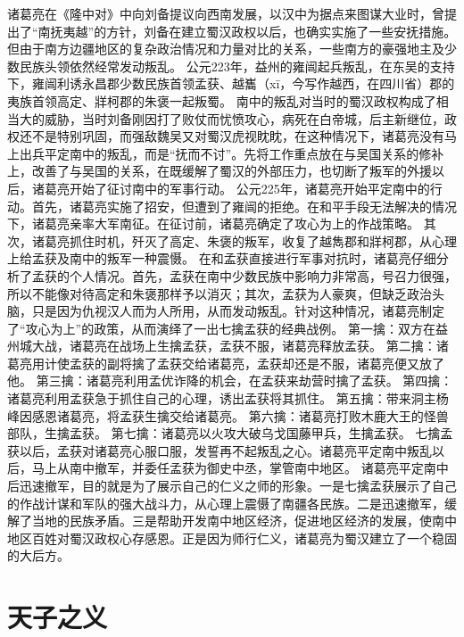 \documentclass[a4paper,12pt,UTF8,twoside]{ctexbook}
\begin{document}
诸葛亮在《隆中对》中向刘备提议向西南发展，以汉中为据点来图谋大业时，曾提出了“南抚夷越”的方针，刘备在建立蜀汉政权以后，也确实实施了一些安抚措施。但由于南方边疆地区的复杂政治情况和力量对比的关系，一些南方的豪强地主及少数民族头领依然经常发动叛乱。
公元223年，益州的雍闿起兵叛乱，在东吴的支持下，雍闿利诱永昌郡少数民族首领孟获、越巂（xī，今写作越西，在四川省）郡的夷族首领高定、牂柯郡的朱褒一起叛蜀。
南中的叛乱对当时的蜀汉政权构成了相当大的威胁，当时刘备刚因打了败仗而忧愤攻心，病死在白帝城，后主新继位，政权还不是特别巩固，而强敌魏吴又对蜀汉虎视眈眈，在这种情况下，诸葛亮没有马上出兵平定南中的叛乱，而是“抚而不讨”。先将工作重点放在与吴国关系的修补上，改善了与吴国的关系，在既缓解了蜀汉的外部压力，也切断了叛军的外援以后，诸葛亮开始了征讨南中的军事行动。
公元225年，诸葛亮开始平定南中的行动。首先，诸葛亮实施了招安，但遭到了雍闿的拒绝。在和平手段无法解决的情况下，诸葛亮亲率大军南征。在征讨前，诸葛亮确定了攻心为上的作战策略。
其次，诸葛亮抓住时机，歼灭了高定、朱褒的叛军，收复了越雋郡和牂柯郡，从心理上给孟获及南中的叛军一种震慑。
在和孟获直接进行军事对抗时，诸葛亮仔细分析了孟获的个人情况。首先，孟获在南中少数民族中影响力非常高，号召力很强，所以不能像对待高定和朱褒那样予以消灭；其次，孟获为人豪爽，但缺乏政治头脑，只是因为仇视汉人而为人所用，从而发动叛乱。针对这种情况，诸葛亮制定了“攻心为上”的政策，从而演绎了一出七擒孟获的经典战例。
第一擒：双方在益州城大战，诸葛亮在战场上生擒孟获，孟获不服，诸葛亮释放孟获。
第二擒：诸葛亮用计使孟获的副将擒了孟获交给诸葛亮，孟获却还是不服，诸葛亮便又放了他。
第三擒：诸葛亮利用孟优诈降的机会，在孟获来劫营时擒了孟获。
第四擒：诸葛亮利用孟获急于抓住自己的心理，诱出孟获将其抓住。
第五擒：带来洞主杨峰因感恩诸葛亮，将孟获生擒交给诸葛亮。
第六擒：诸葛亮打败木鹿大王的怪兽部队，生擒孟获。
第七擒：诸葛亮以火攻大破乌戈国藤甲兵，生擒孟获。
七擒孟获以后，孟获对诸葛亮心服口服，发誓再不起叛乱之心。诸葛亮平定南中叛乱以后，马上从南中撤军，并委任孟获为御史中丞，掌管南中地区。
诸葛亮平定南中后迅速撤军，目的就是为了展示自己的仁义之师的形象。一是七擒孟获展示了自己的作战计谋和军队的强大战斗力，从心理上震慑了南疆各民族。二是迅速撤军，缓解了当地的民族矛盾。三是帮助开发南中地区经济，促进地区经济的发展，使南中地区百姓对蜀汉政权心存感恩。正是因为师行仁义，诸葛亮为蜀汉建立了一个稳固的大后方。


\chapter{天子之义}
\end{document}
